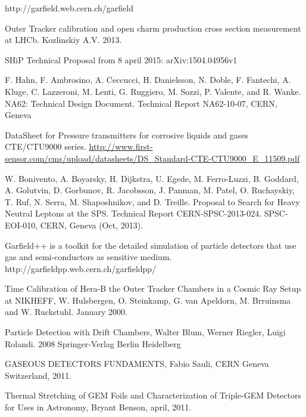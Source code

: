 \documentclass[pdftex,14pt]{scrartcl}
\begin{document}
\newpage
\begin{thebibliography}{00}
	 http://garfield.web.cern.ch/garfield

	Outer Tracker calibration and open charm production cross section measurement at LHCb. Kozlinskiy A.V. 2013. 
	
	 SHiP Technical Proposal from 8 april 2015: arXiv:1504.04956v1	
	
	 F. Hahn, F. Ambrosino, A. Ceccucci, H. Danielsson, N. Doble, F. Fantechi, A. Kluge, C. Lazzeroni, M. Lenti, G. Ruggiero, M. Sozzi, P. Valente, and R. Wanke. NA62: Technical Design Document. Technical Report NA62-10-07, CERN, Geneva
	
	 DataSheet for Pressure transmitters for corrosive liquids and gases CTE/CTU9000 series. \url{http://www.first-sensor.com/cms/upload/datasheets/DS_Standard-CTE-CTU9000_E_11509.pdf}
	
	 W. Bonivento, A. Boyarsky, H. Dijkstra, U. Egede, M. Ferro-Luzzi, B. Goddard, A. Golutvin, D. Gorbunov, R. Jacobsson, J. Panman, M. Patel, O. Ruchayskiy, T. Ruf, N. Serra, M. Shaposhnikov, and D. Treille. Proposal to Search for Heavy Neutral Leptons at the SPS. Technical Report CERN-SPSC-2013-024. SPSC-EOI-010, CERN, Geneva (Oct, 2013).
	
	 Garfield++ is a toolkit for the detailed simulation of particle detectors that use gas and semi-conductors as sensitive medium. http://garfieldpp.web.cern.ch/garfieldpp/

	
	 Time Calibration of Hera-B the Outer Tracker Chambers in a Cosmic Ray Setup  at NIKHEFF, W. Hulsbergen, O. Steinkamp,  G. van Apeldorn, M. Brruinsma and W. Ruckstuhl. January 2000.
	
	 Particle Detection with Drift Chambers, Walter Blum, Werner Riegler, Luigi Rolandi. 2008 Springer-Verlag Berlin Heidelberg
	
	 GASEOUS DETECTORS FUNDAMENTS, Fabio Sauli, CERN Geneva Switzerland, 2011.
	
	 Thermal Stretching of GEM Foils and Characterization of Triple-GEM Detectors  for Uses in Astronomy, Bryant Benson, april, 2011.
\end{thebibliography}
\end{document}
